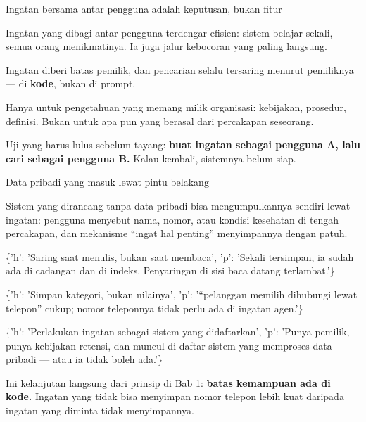 \documentclass[aspectratio=169,11pt,t]{beamer}
\begin{document}
\begin{frame}[shrink=25]{Ingatan bersama antar pengguna adalah keputusan, bukan fitur}
{\fontsize{9.4}{12.6}\selectfont\color{fg2}Ingatan yang dibagi antar pengguna terdengar efisien: sistem belajar sekali, semua orang menikmatinya. Ia juga jalur kebocoran yang paling langsung.\par}\vskip 4pt
\begin{minipage}[t]{0.494\textwidth}
\begin{icardgood}
Ingatan diberi batas pemilik, dan pencarian selalu tersaring menurut pemiliknya --- di \textbf{kode}, bukan di prompt.
\end{icardgood}
\end{minipage}%
\hfill
\begin{minipage}[t]{0.494\textwidth}
\begin{icard}
Hanya untuk pengetahuan yang memang milik organisasi: kebijakan, prosedur, definisi. Bukan untuk apa pun yang berasal dari percakapan seseorang.
\end{icard}
\end{minipage}%
\begin{iband}[signal]
Uji yang harus lulus sebelum tayang: \textbf{buat ingatan sebagai pengguna A, lalu cari sebagai pengguna B.} Kalau kembali, sistemnya belum siap.
\end{iband}
\end{frame}

\begin{frame}[shrink=25]{Data pribadi yang masuk lewat pintu belakang}
{\fontsize{9.4}{12.6}\selectfont\color{fg2}Sistem yang dirancang tanpa data pribadi bisa mengumpulkannya sendiri lewat ingatan: pengguna menyebut nama, nomor, atau kondisi kesehatan di tengah percakapan, dan mekanisme ``ingat hal penting'' menyimpannya dengan patuh.\par}\vskip 4pt
\begin{isteps}
\item \{'h': 'Saring saat menulis, bukan saat membaca', 'p': 'Sekali tersimpan, ia sudah ada di cadangan dan di indeks. Penyaringan di sisi baca datang terlambat.'\}
\item \{'h': 'Simpan kategori, bukan nilainya', 'p': '``pelanggan memilih dihubungi lewat telepon'' cukup; nomor teleponnya tidak perlu ada di ingatan agen.'\}
\item \{'h': 'Perlakukan ingatan sebagai sistem yang didaftarkan', 'p': 'Punya pemilik, punya kebijakan retensi, dan muncul di daftar sistem yang memproses data pribadi --- atau ia tidak boleh ada.'\}
\end{isteps}
\begin{iband}[signal]
Ini kelanjutan langsung dari prinsip di Bab 1: \textbf{batas kemampuan ada di kode.} Ingatan yang tidak bisa menyimpan nomor telepon lebih kuat daripada ingatan yang diminta tidak menyimpannya.
\end{iband}
\end{frame}
\end{document}
